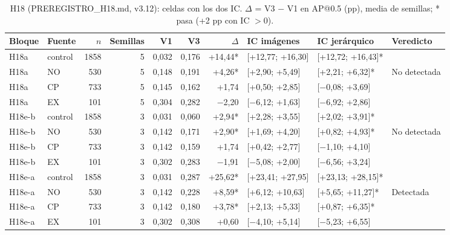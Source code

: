 \begin{table}[H]\centering\small
\caption{H18 (PREREGISTRO\_H18.md, v3.12): celdas con los dos IC. $\Delta$ = V3 $-$ V1 en AP@0.5 (pp), media de semillas; * pasa (+2 pp con IC $>0$).}
\begin{tabular}{@{}llrrrrrlll@{}}\toprule
Bloque & Fuente & $n$ & Semillas & V1 & V3 & $\Delta$ & IC imágenes & IC jerárquico & Veredicto \\\midrule
H18a & control & 1858 & 5 & 0{,}032 & 0{,}176 & +14{,}44* & [+12{,}77; +16{,}30] & [+12{,}72; +16{,}43]* &  \\
H18a & NO & 530 & 5 & 0{,}148 & 0{,}191 & +4{,}26* & [+2{,}90; +5{,}49] & [+2{,}21; +6{,}32]* & No detectada \\
H18a & CP & 733 & 5 & 0{,}145 & 0{,}162 & +1{,}74 & [+0{,}50; +2{,}85] & [$-$0{,}08; +3{,}69] &  \\
H18a & EX & 101 & 5 & 0{,}304 & 0{,}282 & $-$2{,}20 & [$-$6{,}12; +1{,}63] & [$-$6{,}92; +2{,}86] &  \\
H18e-b & control & 1858 & 3 & 0{,}031 & 0{,}060 & +2{,}94* & [+2{,}28; +3{,}55] & [+2{,}02; +3{,}91]* &  \\
H18e-b & NO & 530 & 3 & 0{,}142 & 0{,}171 & +2{,}90* & [+1{,}69; +4{,}20] & [+0{,}82; +4{,}93]* & No detectada \\
H18e-b & CP & 733 & 3 & 0{,}142 & 0{,}159 & +1{,}74 & [+0{,}42; +2{,}77] & [$-$1{,}10; +4{,}10] &  \\
H18e-b & EX & 101 & 3 & 0{,}302 & 0{,}283 & $-$1{,}91 & [$-$5{,}08; +2{,}00] & [$-$6{,}56; +3{,}24] &  \\
H18e-a & control & 1858 & 3 & 0{,}031 & 0{,}287 & +25{,}62* & [+23{,}41; +27{,}95] & [+23{,}13; +28{,}15]* &  \\
H18e-a & NO & 530 & 3 & 0{,}142 & 0{,}228 & +8{,}59* & [+6{,}12; +10{,}63] & [+5{,}65; +11{,}27]* & Detectada \\
H18e-a & CP & 733 & 3 & 0{,}142 & 0{,}180 & +3{,}78* & [+2{,}13; +5{,}33] & [+0{,}87; +6{,}35]* &  \\
H18e-a & EX & 101 & 3 & 0{,}302 & 0{,}308 & +0{,}60 & [$-$4{,}10; +5{,}14] & [$-$5{,}23; +6{,}55] &  \\
\bottomrule\end{tabular}\end{table}

